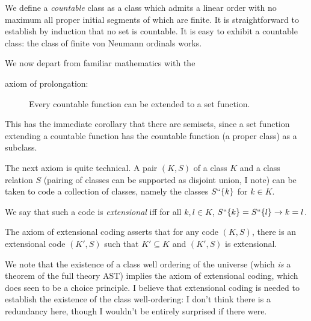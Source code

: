 \documentclass{slides}
\begin{document}
\begin{slide}

We define a {\em countable\/} class as a class which admits a linear order with no maximum all proper initial segments of which are finite.  It is straightforward to establish by induction that no set is countable.  It is easy to exhibit a countable class:  the class of finite von Neumann ordinals works.

We now depart from familiar mathematics with the

\begin{description}

\item[axiom of prolongation:]  Every countable function can be extended to a set function.

\end{description}

This has the immediate corollary that there are semisets, since a set function extending a countable function has the countable function (a proper class) as a subclass.

\end{slide}

\begin{slide}

The next axiom is quite technical.  A pair $(K,S)$ of a class $K$ and a class relation $S$ (pairing of classes can be supported as disjoint union, I note) can be taken to code a collection of classes, namely the classes $S``\{k\}$ for $k \in K$.

We say that such a code is {\em extensional\/} iff for all $k,l \in K$, $S``\{k\} = S``\{l\} \rightarrow k=l$.

The axiom of extensional coding asserts that for any code $(K,S)$, there is an extensional code $(K',S)$ such that
$K' \subseteq K$ and $(K',S)$ is extensional.

We note that the existence of a class well ordering of the universe (which {\em is\/} a theorem of the full theory AST) implies the axiom of extensional coding, which does seen to be a choice principle.  I believe that extensional coding is needed to establish the existence of the class well-ordering:  I don't think there is a redundancy here, though I wouldn't be entirely surprised if there were.

\end{slide}
\end{document}
